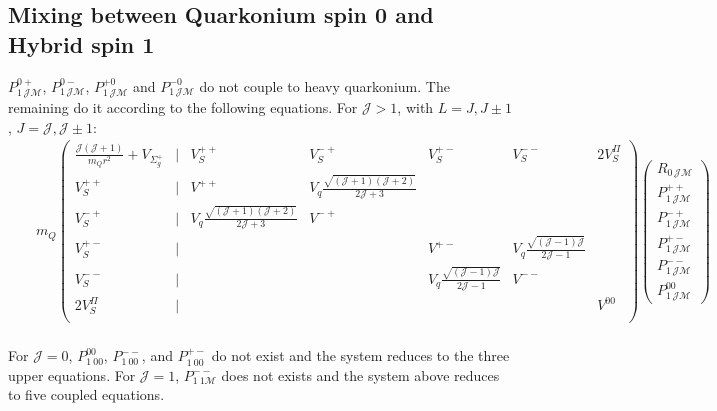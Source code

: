 \documentclass[11pt, a4paper]{article}
\providecommand{\m}{\mathcal{M}}
\begin{document}
\subsection{Mixing between Quarkonium spin 0 and Hybrid spin 1}
$ P_{1\, \mathcal{J}\m}^{0+}$, $ P_{1\, \mathcal{J}\m}^{0-}$, $ P_{1\, \mathcal{J}\m}^{+0}$ and $ P_{1\, \mathcal{J}\m}^{-0}$ do not couple to heavy quarkonium. The remaining 
do it according to the following equations. For $\mathcal{J}> 1$, with $L=J,J \pm 1$, $J=\mathcal{J},\mathcal{J}\pm 1$:
	{
\begin{eqnarray}
	\label{cop1}
 &&	
m_Q\begin{pmatrix}%
 \frac{\mathcal{J}(\mathcal{J}+1)}{m_Q r^2}+V_{\Sigma_g^+}&|&  V_S^{++} & V_S^{-+}& V_S^{+-} &  V_S^{--} & { 2}V_S^\Pi\\ \hline
V_S^{++} &|& V^{++}& V_q\frac{\sqrt{(\mathcal{J}+1)(\mathcal{J}+2)}}{2\mathcal{J}+3} &  &  &  \\
V_S^{-+} &|&  V_q\frac{\sqrt{(\mathcal{J}+1)(\mathcal{J}+2)}}{2\mathcal{J}+3}  & V^{-+}&  &  &  \\
V_S^{+-} &|&  &  & V^{+-}&  V_q\frac{\sqrt{(\mathcal{J}-1)\mathcal{J}}}{2\mathcal{J}-1} &  \\
V_S^{--} &|&   &  & V_q\frac{\sqrt{(\mathcal{J}-1)\mathcal{J}}}{2\mathcal{J}-1} & V^{--}&  \\
{ 2} V_S^\Pi &|&  &  &  &  & V^{00}\\
 	\end{pmatrix} 
	\begin{pmatrix}
 		R_{0\, \mathcal{J}\mathcal{M}} \\ P_{1\, \mathcal{J}\mathcal{M}}^{++} \\
 		P_{1\, \mathcal{J}\mathcal{M}}^{-+} \\ P_{1\, \mathcal{J}\mathcal{M}}^{+-} \\
P_{1\, \mathcal{J}\mathcal{M}}^{--}\\ P_{1\, \mathcal{J}\mathcal{M}}^{00}
 	\end{pmatrix}
	\nonumber \\
	&& 
\end{eqnarray}
	}

For $\mathcal{J} = 0$, $P^{00}_{1 \ 0 0}$,  $P^{--}_{1 \ 0 0}$, and  $P^{+-}_{1 \ 0 0}$
do not exist 
and the system reduces to the three upper equations. 
For $\mathcal{J} =1$, $P^{--}_{1 \ 1 \mathcal{M}}$ does not exists and the system above reduces
to five coupled equations.
\end{document}
